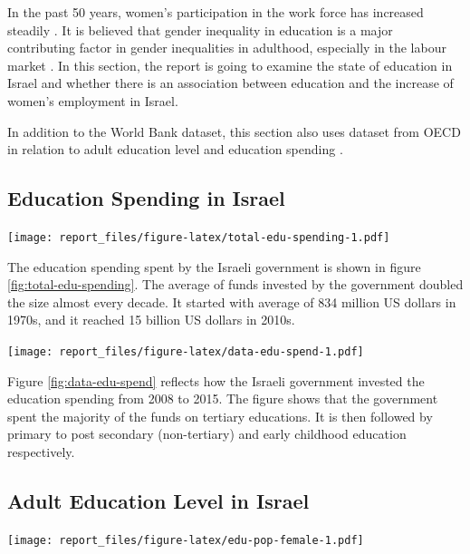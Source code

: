\documentclass[11pt,a4paper,]{article}
\let\origfigure\figure
\let\endorigfigure\endfigure
\renewenvironment{figure}[1][2] {
    \expandafter\origfigure\expandafter[H]
} {
    \endorigfigure
}%
\begin{document}
In the past 50 years, women's participation in the work force has increased steadily \autocite{stier2000women}. It is believed that gender inequality in education is a major contributing factor in gender inequalities in adulthood, especially in the labour market \autocite{marks2008accounting}. In this section, the report is going to examine the state of education in Israel and whether there is an association between education and the increase of women's employment in Israel.

In addition to the World Bank dataset, this section also uses dataset from OECD in relation to adult education level \autocite{edulevel} and education spending \autocite{eduspend}.

\subsection*{Education Spending in Israel}

\begin{figure}
\centering
\texttt{[image: report\_files/figure-latex/total-edu-spending-1.pdf]}
\caption{\label{fig:total-edu-spending}Average Education Expenditure in Israel by Decades}
\end{figure}

The education spending spent by the Israeli government is shown in figure \ref{fig:total-edu-spending}. The average of funds invested by the government doubled the size almost every decade. It started with average of 834 million US dollars in 1970s, and it reached 15 billion US dollars in 2010s.

\begin{figure}
\centering
\texttt{[image: report\_files/figure-latex/data-edu-spend-1.pdf]}
\caption{\label{fig:data-edu-spend}Education Spending in Israel}
\end{figure}

Figure \ref{fig:data-edu-spend} reflects how the Israeli government invested the education spending from 2008 to 2015. The figure shows that the government spent the majority of the funds on tertiary educations. It is then followed by primary to post secondary (non-tertiary) and early childhood education respectively.

\subsection*{Adult Education Level in Israel}

\begin{figure}
\centering
\texttt{[image: report\_files/figure-latex/edu-pop-female-1.pdf]}
\caption{\label{fig:edu-pop-female}Female Adult Education Level in Israel}
\end{figure}
\end{document}
